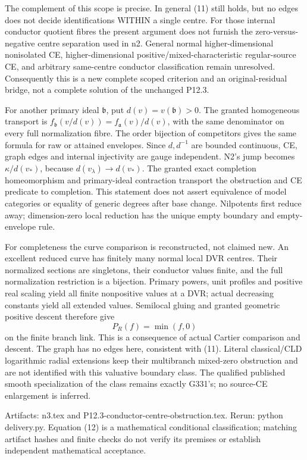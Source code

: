 The complement of this scope is precise. In general (11) still holds,
but no edges does not decide identifications WITHIN a single centre.
For those internal conductor quotient fibres the present argument does
not furnish the zero-versus-negative centre separation used in n2.
General normal higher-dimensional nonisolated CE, higher-dimensional
positive/mixed-characteristic regular-source CE, and arbitrary
same-centre conductor classification remain unresolved. Consequently
this is a new complete scoped criterion and an original-residual bridge,
not a complete solution of the unchanged P12.3.

For another primary ideal $\mathfrak b$, put $d(v)=v(\mathfrak b)>0$.
The granted homogeneous transport is
$f_{\mathfrak b}(v/d(v))=f_{\mathfrak a}(v)/d(v)$, with the same
denominator on every full normalization fibre. The order bijection of
competitors gives the same formula for raw or attained envelopes.
Since $d,d^{-1}$ are bounded continuous, CE, graph edges and internal
injectivity are gauge independent. N2's jump becomes
$\kappa/d(v_*)$, because $d(v_\lambda)\to d(v_*)$.
The granted exact completion homeomorphism and primary-ideal contraction
transport the obstruction and CE predicate to completion. This statement
does not assert equivalence of model categories or equality of generic
degrees after base change. Nilpotents first reduce away; dimension-zero
local reduction has the unique empty boundary and empty-envelope rule.

For completeness the curve comparison is reconstructed, not claimed new.
An excellent reduced curve has finitely many normal local DVR centres.
Their normalized sections are singletons, their conductor values finite,
and the full normalization restriction is a bijection. Primary powers,
unit profiles and positive real scaling yield all finite nonpositive
values at a DVR; actual decreasing constants yield all extended values.
Semilocal gluing and granted geometric positive descent therefore give
\[
                           P_R(f)=\min(f,0)
\]
on the finite branch link. This is a consequence of actual Cartier
comparison and descent. The graph has no edges here, consistent with
(11). Literal classical/CLD logarithmic radial extensions keep their
multibranch mixed-zero obstruction and are not identified with this
valuative boundary class. The qualified published smooth specialization
of the class remains exactly G331's; no source-CE enlargement is inferred.

Artifacts: n3.tex and P12.3-conductor-centre-obstruction.tex. Rerun:
python delivery.py. Equation (12) is a mathematical conditional
classification; matching artifact hashes and finite checks do not
verify its premises or establish independent mathematical acceptance.

